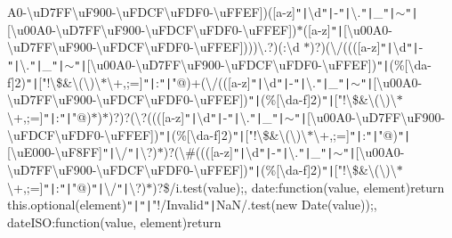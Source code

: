 \+A0-\/\textbackslash{}u\+D7\+F\+F\textbackslash{}u\+F900-\/\textbackslash{}u\+F\+D\+C\+F\textbackslash{}u\+F\+D\+F0-\/\textbackslash{}u\+F\+F\+E\+F])([a-\/z]\texttt{"|}\textbackslash{}d\texttt{"|}-\/\texttt{"|}\textbackslash{}.\texttt{"|}\+\_\+\texttt{"|}$\sim$\texttt{"|}[\textbackslash{}u00\+A0-\/\textbackslash{}u\+D7\+F\+F\textbackslash{}u\+F900-\/\textbackslash{}u\+F\+D\+C\+F\textbackslash{}u\+F\+D\+F0-\/\textbackslash{}u\+F\+F\+E\+F])$\ast$([a-\/z]\texttt{"|}[\textbackslash{}u00\+A0-\/\textbackslash{}u\+D7\+F\+F\textbackslash{}u\+F900-\/\textbackslash{}u\+F\+D\+C\+F\textbackslash{}u\+F\+D\+F0-\/\textbackslash{}u\+F\+F\+E\+F])))\textbackslash{}.?)(\+:\textbackslash{}d $\ast$)?)(\textbackslash{}/((([a-\/z]\texttt{"|}\textbackslash{}d\texttt{"|}-\/\texttt{"|}\textbackslash{}.\texttt{"|}\+\_\+\texttt{"|}$\sim$\texttt{"|}[\textbackslash{}u00\+A0-\/\textbackslash{}u\+D7\+F\+F\textbackslash{}u\+F900-\/\textbackslash{}u\+F\+D\+C\+F\textbackslash{}u\+F\+D\+F0-\/\textbackslash{}u\+F\+F\+E\+F])\texttt{"|}(\%[\textbackslash{}da-\/f]\lcurly{}2\rcurly{})\texttt{"|}["!\textbackslash{}\$\&\textquotesingle{}\textbackslash{}(\textbackslash{})\textbackslash{}$\ast$\textbackslash{}+,;=]\texttt{"|}\+:\texttt{"|}"@)+(\textbackslash{}/(([a-\/z]\texttt{"|}\textbackslash{}d\texttt{"|}-\/\texttt{"|}\textbackslash{}.\texttt{"|}\+\_\+\texttt{"|}$\sim$\texttt{"|}[\textbackslash{}u00\+A0-\/\textbackslash{}u\+D7\+F\+F\textbackslash{}u\+F900-\/\textbackslash{}u\+F\+D\+C\+F\textbackslash{}u\+F\+D\+F0-\/\textbackslash{}u\+F\+F\+E\+F])\texttt{"|}(\%[\textbackslash{}da-\/f]\lcurly{}2\rcurly{})\texttt{"|}["!\textbackslash{}\$\&\textquotesingle{}\textbackslash{}(\textbackslash{})\textbackslash{}$\ast$\textbackslash{}+,;=]\texttt{"|}\+:\texttt{"|}"@)$\ast$)$\ast$)?)?(\textbackslash{}?((([a-\/z]\texttt{"|}\textbackslash{}d\texttt{"|}-\/\texttt{"|}\textbackslash{}.\texttt{"|}\+\_\+\texttt{"|}$\sim$\texttt{"|}[\textbackslash{}u00\+A0-\/\textbackslash{}u\+D7\+F\+F\textbackslash{}u\+F900-\/\textbackslash{}u\+F\+D\+C\+F\textbackslash{}u\+F\+D\+F0-\/\textbackslash{}u\+F\+F\+E\+F])\texttt{"|}(\%[\textbackslash{}da-\/f]\lcurly{}2\rcurly{})\texttt{"|}["!\textbackslash{}\$\&\textquotesingle{}\textbackslash{}(\textbackslash{})\textbackslash{}$\ast$\textbackslash{}+,;=]\texttt{"|}\+:\texttt{"|}"@)\texttt{"|}[\textbackslash{}u\+E000-\/\textbackslash{}u\+F8\+F\+F]\texttt{"|}\textbackslash{}/\texttt{"|}\textbackslash{}?)$\ast$)?(\textbackslash{}\#((([a-\/z]\texttt{"|}\textbackslash{}d\texttt{"|}-\/\texttt{"|}\textbackslash{}.\texttt{"|}\+\_\+\texttt{"|}$\sim$\texttt{"|}[\textbackslash{}u00\+A0-\/\textbackslash{}u\+D7\+F\+F\textbackslash{}u\+F900-\/\textbackslash{}u\+F\+D\+C\+F\textbackslash{}u\+F\+D\+F0-\/\textbackslash{}u\+F\+F\+E\+F])\texttt{"|}(\%[\textbackslash{}da-\/f]\lcurly{}2\rcurly{})\texttt{"|}["!\textbackslash{}\$\&\textquotesingle{}\textbackslash{}(\textbackslash{})\textbackslash{}$\ast$\textbackslash{}+,;=]\texttt{"|}\+:\texttt{"|}"@)\texttt{"|}\textbackslash{}/\texttt{"|}\textbackslash{}?)$\ast$)?\$/i.\+test(value);\rcurly{}, date\+:function(value, element)\lcurly{}return this.\+optional(element)\texttt{"|}\texttt{"|}"!/\+Invalid\texttt{"|}Na\+N/.\+test(new Date(value));\rcurly{}, date\+I\+S\+O\+:function(value, element)\lcurly{}return 